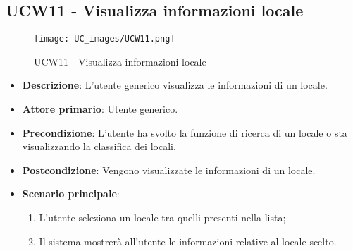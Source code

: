 \subsection{UCW11 - Visualizza informazioni locale}
\begin{figure}[!h]
\centering
\texttt{[image: UC\_images/UCW11.png]} 
\caption{UCW11 - Visualizza informazioni locale}
\end{figure}
\begin{itemize}
    \item \textbf{Descrizione}: L'utente generico visualizza le informazioni di un locale.
    \item \textbf{Attore primario}: Utente generico.
    \item \textbf{Precondizione}: L'utente ha svolto la funzione di ricerca di un locale o sta visualizzando la classifica dei locali.
    \item \textbf{Postcondizione}: Vengono visualizzate le informazioni di un locale.    
    \item \textbf{Scenario principale}: 
    \begin{enumerate}
    \item L'utente seleziona un locale tra quelli presenti nella lista;
    \item Il sistema mostrerà all'utente le informazioni relative al locale scelto.
    \end{enumerate}
\end{itemize}
